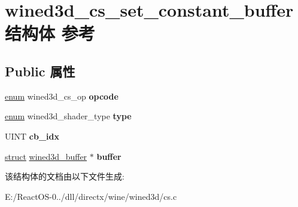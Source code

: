 \hypertarget{structwined3d__cs__set__constant__buffer}{}\section{wined3d\+\_\+cs\+\_\+set\+\_\+constant\+\_\+buffer结构体 参考}
\label{structwined3d__cs__set__constant__buffer}
\subsection*{Public 属性}
\begin{DoxyCompactItemize}
\item 
\mbox{\label{structwined3d__cs__set__constant__buffer_af16c76054434f5c569c3b3a9275ef847}} 
\hyperlink{interfaceenum}{enum} wined3d\+\_\+cs\+\_\+op {\bfseries opcode}
\item 
\mbox{\label{structwined3d__cs__set__constant__buffer_a8d5834b687461322bfe7b334471da7bd}} 
\hyperlink{interfaceenum}{enum} wined3d\+\_\+shader\+\_\+type {\bfseries type}
\item 
\mbox{\label{structwined3d__cs__set__constant__buffer_a7864e1b7c0e9bd2721b712142743578e}} 
U\+I\+NT {\bfseries cb\+\_\+idx}
\item 
\mbox{\label{structwined3d__cs__set__constant__buffer_ac79d5681d75bea8488ce519f841a34da}} 
\hyperlink{interfacestruct}{struct} \hyperlink{structwined3d__buffer}{wined3d\+\_\+buffer} $\ast$ {\bfseries buffer}
\end{DoxyCompactItemize}


该结构体的文档由以下文件生成\+:\begin{DoxyCompactItemize}
\item 
E\+:/\+React\+O\+S-\/0../dll/directx/wine/wined3d/cs.\+c\end{DoxyCompactItemize}

